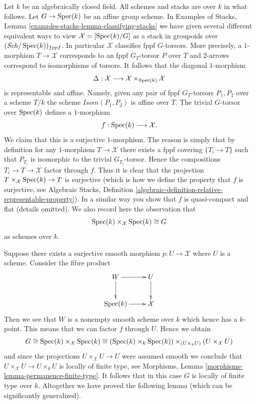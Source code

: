 \medskip\noindent
Let $k$ be an algebraically closed field.
All schemes and stacks are over $k$ in what follows.
Let $G \to \mathop{\mathrm{Spec}}(k)$ be an affine group scheme.
In Examples of Stacks,
Lemma \ref{examples-stacks-lemma-classifying-stacks}
we have given several different equivalent ways to view
$\mathcal{X} = [\mathop{\mathrm{Spec}}(k)/G]$ as a stack in groupoids over
$(\mathit{Sch}/\mathop{\mathrm{Spec}}(k))_{fppf}$. In particular $\mathcal{X}$ classifies
fppf $G$-torsors. More precisely, a $1$-morphism $T \to \mathcal{X}$
corresponds to an fppf $G_T$-torsor $P$ over $T$ and $2$-arrows
correspond to isomorphisms of torsors. It follows that
the diagonal $1$-morphism
$$
\Delta :
\mathcal{X}
\longrightarrow
\mathcal{X} \times_{\mathop{\mathrm{Spec}}(k)} \mathcal{X}
$$
is representable and affine. Namely, given any pair
of fppf $G_T$-torsors $P_1, P_2$ over a scheme $T/k$ the
scheme $\mathit{Isom}(P_1, P_2)$ is affine over $T$.
The trivial $G$-torsor over $\mathop{\mathrm{Spec}}(k)$ defines a $1$-morphism
$$
f : \mathop{\mathrm{Spec}}(k) \longrightarrow \mathcal{X}.
$$
We claim that this is a surjective $1$-morphism. The reason is simply
that by definition for any $1$-morphism $T \to \mathcal{X}$ there exists
a fppf covering $\{T_i \to T\}$ such that $P_{T_i}$ is isomorphic
to the trivial $G_{T_i}$-torsor. Hence the compositions
$T_i \to T \to \mathcal{X}$ factor through $f$. Thus it is clear that
the projection $T \times_\mathcal{X} \mathop{\mathrm{Spec}}(k) \to T$
is surjective (which is how we define the property that $f$ is surjective, see
Algebraic Stacks,
Definition \ref{algebraic-definition-relative-representable-property}).
In a similar way you show that $f$ is quasi-compact and flat (details omitted).
We also record here the observation that
$$
\mathop{\mathrm{Spec}}(k) \times_\mathcal{X} \mathop{\mathrm{Spec}}(k) \cong G
$$
as schemes over $k$.

\medskip\noindent
Suppose there exists a surjective smooth morphism
$p : U \to \mathcal{X}$ where $U$ is a scheme.
Consider the fibre product
$$
\xymatrix{
W \ar[d] \ar[r] & U \ar[d] \\
\Spec(k) \ar[r] & \mathcal{X}
}
$$
Then we see that $W$ is a nonempty smooth scheme over $k$ which
hence has a $k$-point. This means that we can factor $f$ through $U$.
Hence we obtain
$$
G \cong
\mathop{\mathrm{Spec}}(k) \times_\mathcal{X} \mathop{\mathrm{Spec}}(k) \cong
(\mathop{\mathrm{Spec}}(k) \times_k \mathop{\mathrm{Spec}}(k))
\times_{(U \times_k U)}
(U \times_\mathcal{X} U)
$$
and since the projections $U \times_\mathcal{X} U \to U$ were
assumed smooth we conclude that
$U \times_\mathcal{X} U \to U \times_k U$ is
locally of finite type, see
Morphisms, Lemma \ref{morphisms-lemma-permanence-finite-type}.
It follows that in this case $G$ is locally of finite type over $k$.
Altogether we have proved the following lemma (which can be
significantly generalized).

